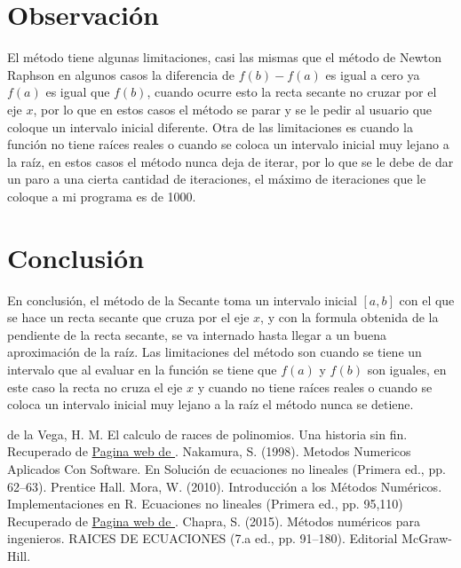 \documentclass[12pt]{article}
\begin{document}
		\section*{\centering Observación}\label{sec:Observacion}
			El método tiene algunas limitaciones, casi las mismas que el método de Newton Raphson en 
			algunos casos la diferencia de $ f(b) - f(a) $ es igual a cero ya $ f(a) $ es igual que $ f(b) $, cuando ocurre 
			esto la recta secante no cruzar por el eje $ x $, por lo que en estos casos el método se parar y se le 
			pedir al usuario que coloque un intervalo inicial diferente. Otra de las limitaciones es cuando 
			la función no tiene raíces reales o cuando se coloca un intervalo inicial muy lejano a la raíz, 
			en estos casos el método nunca deja de iterar, por lo que se le debe de dar un paro a una cierta cantidad 
			de iteraciones, el máximo de iteraciones que le coloque a mi programa es de 1000.
		\section*{\centering Conclusión}\label{sec:Conclusion}
			En conclusión, el método de la Secante toma un intervalo inicial $ [a,b] $ con el que se hace un 
			recta secante que cruza por el eje $ x $, y con la formula obtenida de la pendiente de la recta 
			secante, se va internado hasta llegar a un buena aproximación de la raíz. Las limitaciones del 
			método son cuando se tiene un intervalo que al evaluar en la función se tiene que $ f(a) $ y $ f(b) $ 
			son iguales, en este caso la recta no cruza el eje $ x $ y cuando no tiene raíces reales o cuando se 
			coloca un intervalo inicial muy lejano a la raíz el método nunca se detiene.

		\centering
		\begin{thebibliography}{10}
			 de la Vega, H. M. El calculo de raıces de polinomios. Una historia sin fin. Recuperado de
							\href{http://www.matedu.cinvestav.mx/~elcalculoysuensenanza/investigacion/articulosPDF/Madrid.pdf}{Pagina web de \cite{bib:item1}}.
			 Nakamura, S. (1998). Metodos Numericos Aplicados Con Software. En Solución de ecuaciones no lineales (Primera ed., pp. 62–63). Prentice Hall.
			 Mora, W. (2010). Introducción a los Métodos Numéricos. Implementaciones en R. Ecuaciones no lineales (Primera ed., pp. 95,110) Recuperado de
							\href{https://tecdigital.tec.ac.cr/revistamatematica/Libros/WMora_MetodosNumericos/2017_Principal_MetodosNumericos-con-R.pdf}{Pagina web de \cite{bib:item3}}. 
							 Chapra, S. (2015). Métodos numéricos para ingenieros. RAICES DE ECUACIONES (7.a ed., pp. 91–180). Editorial McGraw-Hill.				
			
		\end{thebibliography}

	
\end{document}
